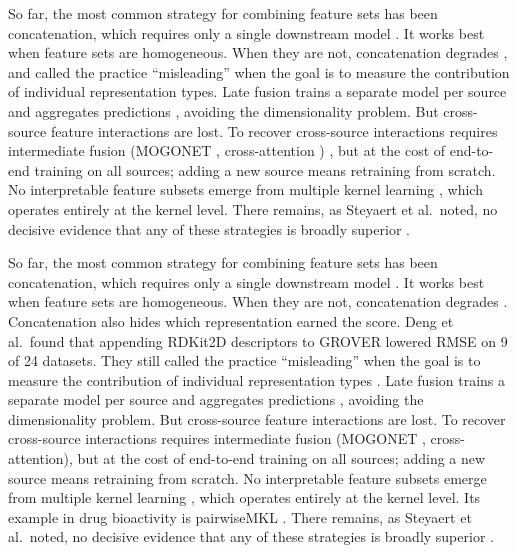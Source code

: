 So far, the most common strategy for combining feature sets has been concatenation, which requires only a single downstream model \citep{Stahlschmidt2022}. It works best when feature sets are homogeneous. When they are not, concatenation degrades \citep{Stahlschmidt2022}, and \citet{Deng2023} called the practice ``misleading'' when the goal is to measure the contribution of individual representation types. Late fusion trains a separate model per source and aggregates predictions \citep{Steyaert2023}, avoiding the dimensionality problem. But cross-source feature interactions are lost. To recover cross-source interactions requires intermediate fusion (MOGONET \citep{Wang2021}, cross-attention \citep{Beaude2025}) %
, but at the cost of end-to-end training on all sources; adding a new source means retraining from scratch. No interpretable feature subsets emerge from multiple kernel learning \citep{Gonen2011}, which operates entirely at the kernel level. There remains, as Steyaert et al.\ noted, no decisive evidence that any of these strategies is broadly superior \citep{Steyaert2023}.

So far, the most common strategy for combining feature sets has been concatenation, which requires only a single downstream model \citep{Stahlschmidt2022}. It works best when feature sets are homogeneous. When they are not, concatenation degrades \citep{Stahlschmidt2022}. Concatenation also hides which representation earned the score. Deng et al.\ found that appending RDKit2D descriptors to GROVER lowered RMSE on 9 of 24 datasets. They still called the practice ``misleading'' when the goal is to measure the contribution of individual representation types \citep{Deng2023}. Late fusion trains a separate model per source and aggregates predictions \citep{Steyaert2023}, avoiding the dimensionality problem. But cross-source feature interactions are lost. To recover cross-source interactions requires intermediate fusion (MOGONET \citep{Wang2021}, cross-attention), but at the cost of end-to-end training on all sources; adding a new source means retraining from scratch. No interpretable feature subsets emerge from multiple kernel learning \citep{Gonen2011}, which operates entirely at the kernel level. Its example in drug bioactivity is pairwiseMKL \citep{Cichonska2018}. There remains, as Steyaert et al.\ noted, no decisive evidence that any of these strategies is broadly superior \citep{Steyaert2023}.

